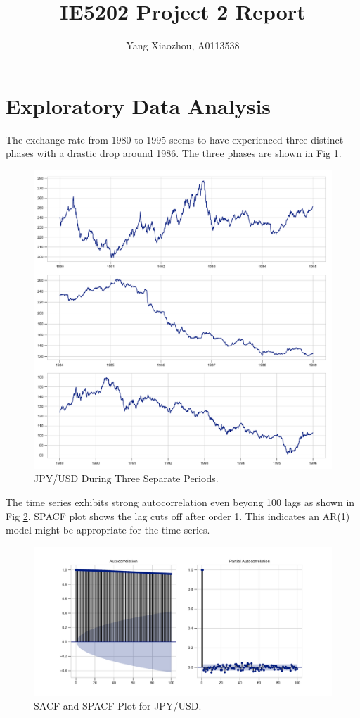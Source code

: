\documentclass[]{article}
\title{IE5202 Project 2 Report}
\author{Yang Xiaozhou, A0113538}
\begin{document}
\maketitle

\section{Exploratory Data Analysis}

The exchange rate from 1980 to 1995 seems to have experienced three distinct phases with a drastic drop around 1986. The three phases are shown in Fig \ref{fig:jpy_usd_three_peridos}.
%
\begin{figure}[t]
	\centering
	\includegraphics[width=.5\columnwidth]{../Figures/jpy_usd_three_periods.pdf}
	\caption{JPY/USD During Three Separate Periods.}
	\label{fig:jpy_usd_three_peridos}
\end{figure}
%
The time series exhibits strong autocorrelation even beyong 100 lags as shown in Fig \ref{fig:sacf_n_spacf_plot}. SPACF plot shows the lag cuts off after order 1. This indicates an AR(1) model might be appropriate for the time series. 
%
\begin{figure}[ht]
	\centering
	\includegraphics[width=.8\columnwidth]{../Figures/sacf_n_spacf_plot.pdf}
	\caption{SACF and SPACF Plot for JPY/USD.}
	\label{fig:sacf_n_spacf_plot}
\end{figure}
\end{document}
